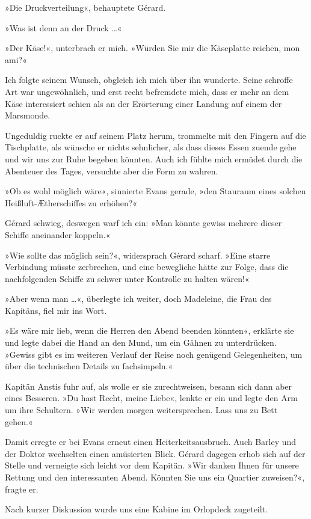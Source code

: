 »Die Druckverteilung«, behauptete Gérard.

»Was ist denn an der Druck \ldots{}«

»Der Käse!«, unterbrach er mich. »Würden Sie mir die Käseplatte
reichen, mon ami?«

Ich folgte seinem Wunsch, obgleich ich mich über ihn wunderte.
Seine schroffe Art war ungewöhnlich, und erst recht befremdete
mich, dass er mehr an dem Käse interessiert schien als an der
Erörterung einer Landung auf einem der Marsmonde.

Ungeduldig ruckte er auf seinem Platz herum, trommelte mit den
Fingern auf die Tischplatte, als wünsche er nichts sehnlicher, als
dass dieses Essen zuende gehe und wir uns zur Ruhe begeben könnten.
Auch ich fühlte mich ermüdet durch die Abenteuer des Tages,
versuchte aber die Form zu wahren.

»Ob es wohl möglich wäre«, sinnierte Evans gerade, »den Stauraum
eines solchen Heißluft-Ætherschiffes zu erhöhen?«

Gérard schwieg, deswegen warf ich ein: »Man könnte gewiss mehrere
dieser Schiffe aneinander koppeln.«

»Wie sollte das möglich sein?«, widersprach Gérard scharf. »Eine
starre Verbindung müsste zerbrechen, und eine bewegliche hätte zur
Folge, dass die nachfolgenden Schiffe zu schwer unter Kontrolle zu
halten wären!«

»Aber wenn man \ldots{}«, überlegte ich weiter, doch Madeleine, die Frau
des Kapitäns, fiel mir ins Wort.

»Es wäre mir lieb, wenn die Herren den Abend beenden könnten«,
erklärte sie und legte dabei die Hand an den Mund, um ein Gähnen zu
unterdrücken. »Gewiss gibt es im weiteren Verlauf der Reise noch
genügend Gelegenheiten, um über die technischen Details zu
fachsimpeln.«

Kapitän Anstis fuhr auf, als wolle er sie zurechtweisen, besann
sich dann aber eines Besseren. »Du hast Recht, meine Liebe«, lenkte
er ein und legte den Arm um ihre Schultern. »Wir werden morgen
weitersprechen. Lass uns zu Bett gehen.«

Damit erregte er bei Evans erneut einen Heiterkeitsausbruch. Auch
Barley und der Doktor wechselten einen amüsierten Blick. Gérard
dagegen erhob sich auf der Stelle und verneigte sich leicht vor dem
Kapitän. »Wir danken Ihnen für unsere Rettung und den interessanten
Abend. Könnten Sie uns ein Quartier zuweisen?«, fragte er.

Nach kurzer Diskussion wurde uns eine Kabine im Orlopdeck
zugeteilt.

